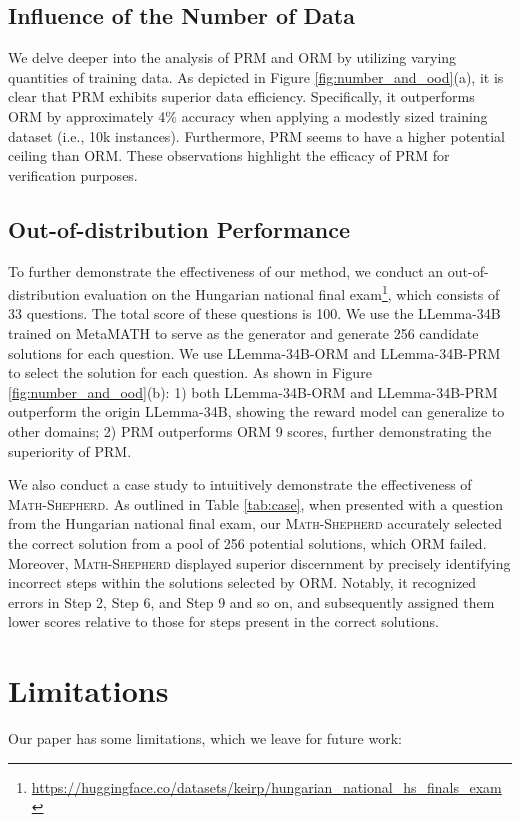 \subsection{Influence of the Number of Data} We delve deeper into the analysis of PRM and ORM by utilizing varying quantities of training data. As depicted in Figure \ref{fig:number_and_ood}(a), it is clear that PRM exhibits superior data efficiency. Specifically, it outperforms ORM by approximately 4\% accuracy when applying a modestly sized training dataset (i.e., 10k instances). Furthermore, PRM seems to have a higher potential ceiling than ORM. These observations highlight the efficacy of PRM for verification purposes.

\subsection{Out-of-distribution Performance} To further demonstrate the effectiveness of our method, we conduct an out-of-distribution evaluation on the Hungarian national final exam\footnote{\url{https://huggingface.co/datasets/keirp/hungarian_national_hs_finals_exam}}, which consists of 33 questions. The total score of these questions is 100. We use the LLemma-34B trained on MetaMATH to serve as the generator and generate 256 candidate solutions for each question. We use LLemma-34B-ORM and LLemma-34B-PRM to select the solution for each question. As shown in Figure \ref{fig:number_and_ood}(b): 1) both  LLemma-34B-ORM and LLemma-34B-PRM outperform the origin LLemma-34B, showing the reward model can generalize to other domains; 2) PRM outperforms ORM 9 scores, further demonstrating the superiority of PRM. 

We also conduct a case study to intuitively demonstrate the effectiveness of \textsc{Math-Shepherd}. 
As outlined in Table \ref{tab:case}, when presented with a question from the Hungarian national final exam, our \textsc{Math-Shepherd} accurately selected the correct solution from a pool of 256 potential solutions, which ORM failed. Moreover, \textsc{Math-Shepherd} displayed superior discernment by precisely identifying incorrect steps within the solutions selected by ORM. Notably, it recognized errors in Step 2, Step 6, and Step 9 and so on, and subsequently assigned them lower scores relative to those for steps present in the correct solutions.

\section{Limitations}
Our paper has some limitations, which we leave for future work:

